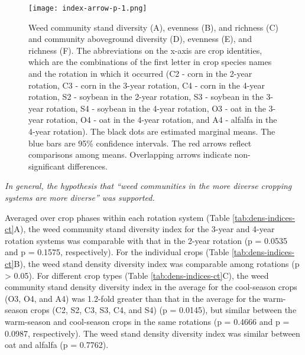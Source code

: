 \documentclass[
]{article}
\begin{document}
\begin{figure}[H]
\centering
\texttt{[image: index-arrow-p-1.png]}
\caption{\label{fig:index-arrow-p}Weed community stand diversity (A), evenness (B), and richness (C) and community aboveground diversity (D), evenness (E), and richness (F). The abbreviations on the x-axis are crop identities, which are the combinations of the first letter in crop species names and the rotation in which it occurred (C2 - corn in the 2-year rotation, C3 - corn in the 3-year rotation, C4 - corn in the 4-year rotation, S2 - soybean in the 2-year rotation, S3 - soybean in the 3-year rotation, S4 - soybean in the 4-year rotation, O3 - oat in the 3-year rotation, O4 - oat in the 4-year rotation, and A4 - alfalfa in the 4-year rotation). The black dots are estimated marginal means. The blue bars are 95\% confidence intervals. The red arrows reflect comparisons among means. Overlapping arrows indicate non-significant differences.}
\end{figure}

\emph{In general, the hypothesis that ``weed communities in the more diverse cropping systems are more diverse'' was supported.}

Averaged over crop phases within each rotation system (Table \ref{tab:dens-indices-ct}A), the weed community stand diversity index for the 3-year and 4-year rotation systems was comparable with that in the 2-year rotation (p = 0.0535 and p = 0.1575, respectively). For the individual crops (Table \ref{tab:dens-indices-ct}B), the weed stand density diversity index was comparable among rotations (p \textgreater{} 0.05). For different crop types (Table \ref{tab:dens-indices-ct}C), the weed community stand density diversity index in the average for the cool-season crops (O3, O4, and A4) was 1.2-fold greater than that in the average for the warm-season crops (C2, S2, C3, S3, C4, and S4) (p = 0.0145), but similar between the warm-season and cool-season crops in the same rotations (p = 0.4666 and p = 0.0987, respectively). The weed stand density diversity index was similar between oat and alfalfa (p = 0.7762).
\end{document}
